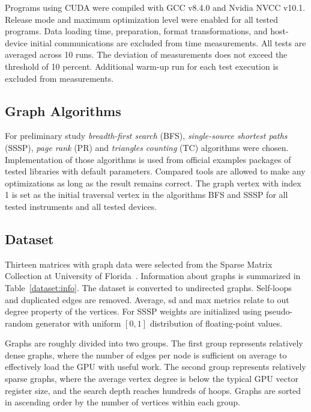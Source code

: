 Programs using CUDA were compiled with GCC v8.4.0 and Nvidia NVCC v10.1.
Release mode and maximum optimization level were enabled for all tested programs. 
Data loading time, preparation, format transformations, and host-device initial communications are excluded from time measurements. 
All tests are averaged across 10 runs. The deviation of measurements does not exceed the threshold of 10 percent. Additional warm-up run for each test execution is excluded from measurements.

\subsection{Graph Algorithms}

For preliminary study \textit{breadth-first search} (BFS), \textit{single-source shortest paths} (SSSP), \textit{page rank} (PR) and \textit{triangles counting} (TC) algorithms were chosen.
Implementation of those algorithms is used from official examples packages of tested libraries with default parameters. Compared tools are allowed to make any optimizations as long as the result remains correct.
The graph vertex with index 1 is set as the initial traversal vertex in the algorithms BFS and SSSP for all tested instruments and all tested devices.

\subsection{Dataset}

Thirteen matrices with graph data were selected from the Sparse Matrix Collection at University of Florida~\cite{dataset:10.1145/2049662.2049663}. 
Information about graphs is summarized in Table~\ref{dataset:info}. 
The dataset is converted to undirected graphs. 
Self-loops and duplicated edges are removed. 
Average, sd and max metrics relate to out degree property of the vertices.
For SSSP weights are initialized using pseudo-random generator with uniform $[0, 1]$ distribution of floating-point values.

Graphs are roughly divided into two groups. 
The first group represents relatively dense graphs, where the number of edges per node is sufficient on average to effectively load the GPU with useful work. 
The second group represents relatively sparse graphs, where the average vertex degree is below the typical GPU vector register size, and the search depth reaches hundreds of hoops. 
Graphs are sorted in ascending order by the number of vertices within each group.

